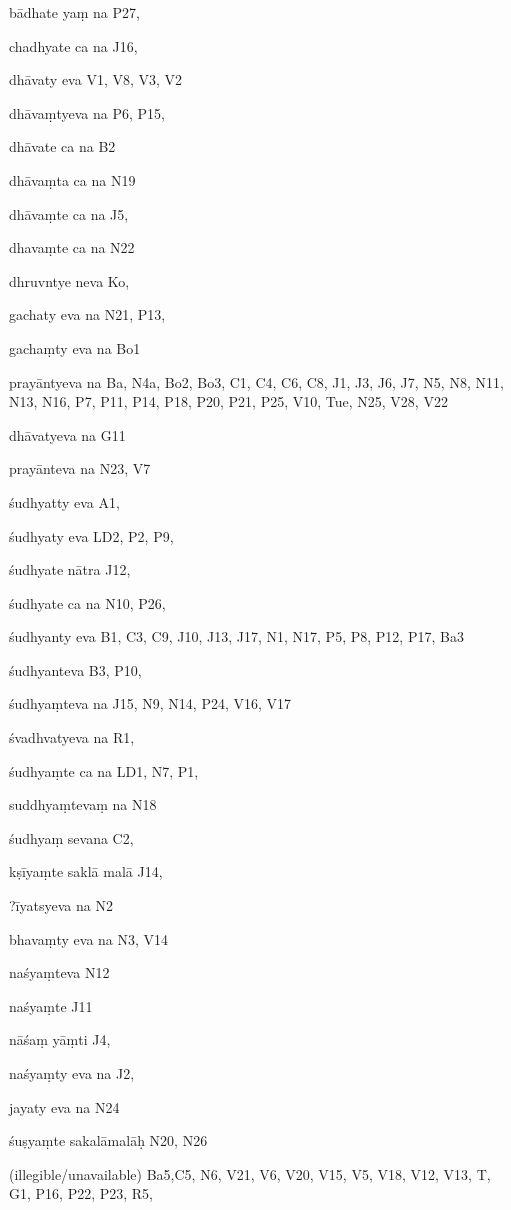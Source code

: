 \begin{ekdosis}
\begin{marma}[hp01_055]
\begin{marma}[hp02_009]
\begin{marma}[hp02_011]
 \begin{marma}[hp02_25d]
\item[bādhate yaṃ na] P27,
\item[chadhyate ca na] J16,
\item[dhāvaty eva] V1, V8, V3, V2
\item[dhāvaṃtyeva na] P6, P15, 
\item[dhāvate ca na] B2
\item[dhāvaṃta ca na] N19
\item[dhāvaṃte ca na] J5,
\item[dhavaṃte ca na] N22
\item[dhruvntye neva] Ko,
\item[gachaty eva na] N21, P13, 
\item[gachaṃty eva na] Bo1
\item[prayāntyeva na] Ba, N4a, Bo2, Bo3, C1, C4, C6, C8, J1, J3, J6, J7, N5, N8, N11, N13, N16, P7, P11, P14, P18, P20, P21, P25, V10, Tue, N25, V28, V22
\item[dhāvatyeva na] G11
\item[prayānteva na] N23, V7
\item[śudhyatty eva] A1,
\item[śudhyaty eva] LD2, P2, P9, 
\item[śudhyate nātra] J12,
\item[śudhyate ca na] N10, P26, 
\item[śudhyanty eva] B1, C3, C9, J10, J13, J17, N1, N17, P5, P8, P12, P17, Ba3
\item[śudhyanteva] B3, P10, 
\item[śudhyaṃteva na] J15, N9, N14, P24, V16, V17
\item[śvadhvatyeva na] R1,
\item[śudhyaṃte ca na] LD1, N7, P1, 
\item[suddhyaṃtevaṃ na] N18
\item[śudhyaṃ sevana] C2,
\item[kṣīyaṃte saklā malā] J14,
\item[?īyatsyeva na] N2
\item[bhavaṃty eva na] N3, V14
\item[naśyaṃteva] N12
\item[naśyaṃte] J11
\item[nāśaṃ yāṃti] J4, 
\item[naśyaṃty eva na] J2,
\item[jayaty eva na] N24
\item[śuṣyaṃte sakalāmalāḥ] N20, N26
\item[(illegible/unavailable)] Ba5,C5, N6, V21, V6, V20, V15, V5, V18, V12, V13, T, G1, P16, P22, P23, R5,
  \begin{description}


\end{description}
\end{marma}
\end{marma}
\end{marma}
\end{marma}
\end{ekdosis}

